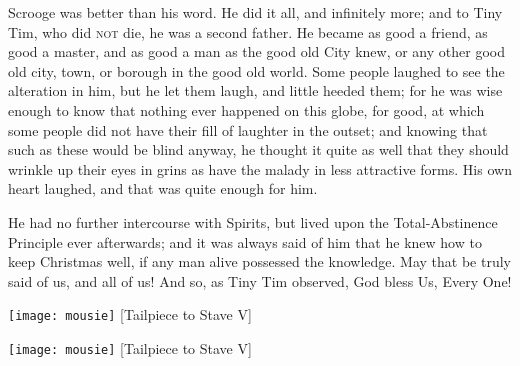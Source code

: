 Scrooge was better than his word. He did it all, and infinitely more; and to Tiny Tim, who did \textsc{not} die, he was a second father. He became as good a friend, as good a master, and as good a man as the good old City knew, or any other good old city, town, or borough in the good old world. Some people laughed to see the alteration in him, but he let them laugh, and little heeded them; for he was wise enough to know that nothing ever happened on this globe, for good, at which some people did not have their fill of laughter in the outset; and knowing that such as these would be blind anyway, he thought it quite as well that they should wrinkle up their eyes in grins as have the malady in less attractive forms. His own heart laughed, and that was quite enough for him.

He had no further intercourse with Spirits, but lived upon the Total-Abstinence Principle ever afterwards; and it was always said of him that he knew how to keep Christmas well, if any man alive possessed the knowledge. May that be truly said of us, and all of us! And so, as Tiny Tim observed, God bless Us, Every One!


\makeatletter
{}
{%
	\begin{center}
		\texttt{[image: mousie]}
		[Tailpiece to Stave V]{}
	\end{center}
	\enlargethispage {\baselineskip} 
	\clearpage
}{%
	\begin{center}
		\texttt{[image: mousie]}
		[Tailpiece to Stave V]{}
	\end{center}
	\enlargethispage {\baselineskip} 
	\clearpage
}
\makeatother


